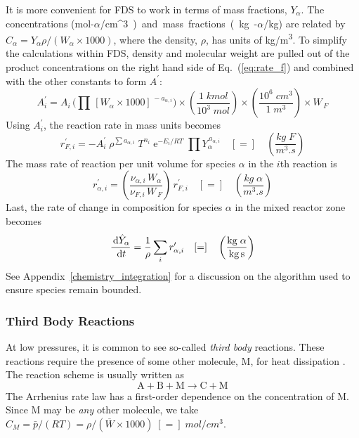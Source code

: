 It is more convenient for FDS to work in terms of mass fractions, $Y_{\alpha}$.  The concentrations (\si{mol-$\alpha$/cm^3}) and mass fractions (kg-$\alpha$/kg) are related by $C_{\alpha}=Y_{\alpha} \rho/(W_{\alpha} \times 1000)$, where the density, $\rho$, has units of \si{kg/m^3}.
To simplify the calculations within FDS, density and molecular weight are pulled out of the product concentrations on the right hand side of Eq.~(\ref{eq:rate_f}) and combined with the other constants to form $A^{\prime}$:
\begin{equation}\label{eq:aprime}
A^{\prime}_{i} = A_{i} \, \bigg( \prod \, [W_{\alpha} \times 1000]^{\,-a_{\alpha,i}} \bigg) \times \left(\frac{1 \; \si{kmol}}{10^3 \; \si{mol}}\right) \times \left(\frac{10^6 \; \si{cm^3}}{1 \; \si{m^3}}\right) \times W_{\,\si{F}}
\end{equation}
Using $A_i^{\prime}$, the reaction rate in mass units becomes
\begin{equation}\label{eq:finite_rate_fin}
r^{\prime}_{\si{F},i} = -A_i^{\prime}\;\rho^{\sum a_{\alpha,i}}\;T^{n_i}\;\mathrm{e}^{-E_i/RT}\;\prod Y_{\alpha}^{\,a_{\alpha,i}} \quad [=] \quad \left(\frac{\si{kg \; F}}{\si{m^3.s}}\right)
\end{equation}
The mass rate of reaction per unit volume for species $\alpha$ in the $i$th reaction is
\begin{equation}\label{eq:rate_a_y}
r^{\prime}_{\alpha,i}= \left(\frac{\nu_{\alpha,i}\,W_{\alpha}}{\nu_{\si{F},i}\,W_{\,\si{F}}}\right)\,r^{\prime}_{\si{F},i} \quad [=] \quad \left(\frac{\si{kg \; \alpha}}{\si{m^3.s}}\right)
\end{equation}
Last, the rate of change in composition for species $\alpha$ in the mixed reactor zone becomes
\begin{equation}\label{rate_expression_y}
\frac{\d \hat{Y}_{\alpha}}{\d t} = \frac{1}{\rho}\sum_{i} r^{\prime}_{\alpha,i} \quad [=] \quad \left(\frac{\si{kg \; \alpha}}{\si{kg.s}}\right)
\end{equation}
See Appendix~\ref{chemistry_integration} for a discussion on the algorithm used to ensure species remain bounded.

\subsubsection{Third Body Reactions}

At low pressures, it is common to see so-called \emph{third body} reactions.  These reactions require the presence of some other molecule, M, for heat dissipation \cite{Turns:1996}.  The reaction scheme is usually written as
\begin{equation}\label{eq:third_body}
\mathrm{A} + \mathrm{B} + \mathrm{M} \rightarrow \mathrm{C} + \mathrm{M}
\end{equation}
The Arrhenius rate law has a first-order dependence on the concentration of M.  Since M may be \emph{any} other molecule, we take $C_{\si{M}} = \bar{p}/(R T) = \rho/(\overline{W} \times 1000) \;[=]\;\si{mol/cm^3}$.

